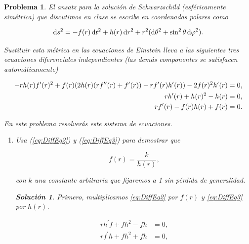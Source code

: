 \documentclass[12pt]{article}
\theoremstyle{break}
\newtheorem{exercise}{Problema}
\theoremstyle{nonumberbreak}
\newtheorem{solution}{Solución}
\begin{document}
    \pagebreak
    \begin{exercise}
      El ansatz para la solución	 de Schwarzschild (esféricamente simétrica) que discutimos en clase se escribe en coordenadas polares como

      \begin{equation}
        \odif{s^{2}} = -f(r)\odif{t^{2}} + h(r)\odif{r^{2}} + r^{2}(\odif{\theta^{2}} + \sin^{2}\theta\odif{\varphi^{2}}).
        \label{eq:MetricProblem3}
      \end{equation}

      Sustituir esta métrica en las ecuaciones de Einstein lleva a las siguientes tres ecuaciones diferenciales independientes (las demás componentes se satisfacen automáticamente)

      \begin{align}
        -rh(r)\tensor{f}{^{\prime}}(r)^{2} + f(r)(2h(r)(r\tensor{f}{^{\prime\prime}}(r) + \tensor{f}{^{\prime}}(r)) - r\tensor{f}{^{\prime}}(r)\tensor{h}{^{\prime}}(r)) - 2f(r)^{2}\tensor{h}{^{\prime}}(r) &= 0,\label{eq:DiffEq1}\\
        r\tensor{h}{^{\prime}}(r) + h(r)^{2} - h(r) &= 0,\label{eq:DiffEq2}\\
        r\tensor{f}{^{\prime}}(r) - f(r)h(r) + f(r) &= 0.\label{eq:DiffEq3}
      \end{align}

      En este problema resolverás este sistema de ecuaciones.

      \begin{enumerate}[label = \alph*)]
        \item Usa (\ref{eq:DiffEq2}) y (\ref{eq:DiffEq3}) para demostrar que
        
        \begin{equation}
          f(r) = \dfrac{k}{h(r)},
        \end{equation}

        con \(k\) una constante arbitraria que fijaremos a 1 sin pérdida de generalidad.

        \begin{solution}
          Primero, multiplicamos \cref{eq:DiffEq2} por \(f(r)\) y \cref{eq:DiffEq3} por \(h(r)\).

          \begin{align}
            rh^{\prime}f + fh^{2} - fh &= 0,\label{eq:DiffEq2ByF}\\
            rf^{\prime}h + fh^{2} + fh &= 0,\label{eq:DiffEq3ByH}
          \end{align}


\end{solution}
\end{enumerate}
\end{exercise}
\end{document}
